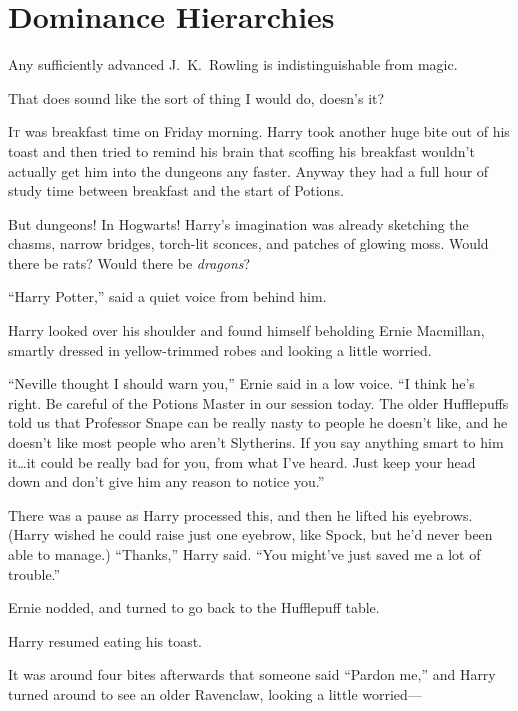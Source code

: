 \chapter{Dominance Hierarchies}

\begin{chapterOpeningAuthorNote}
Any sufficiently advanced J.~K.~Rowling is indistinguishable from magic.
\end{chapterOpeningAuthorNote}
\begin{chapterOpeningQuote}
That does sound like the sort of thing I would do, doesn’s it?
\end{chapterOpeningQuote}

\lettrine{I}{t} was breakfast time on Friday morning. Harry took another huge bite out of his toast and then tried to remind his brain that scoffing his breakfast wouldn’t actually get him into the dungeons any faster. Anyway they had a full hour of study time between breakfast and the start of Potions.

But dungeons! In Hogwarts! Harry’s imagination was already sketching the chasms, narrow bridges, torch-lit sconces, and patches of glowing moss. Would there be rats? Would there be \emph{dragons}?

“Harry Potter,” said a quiet voice from behind him.

Harry looked over his shoulder and found himself beholding Ernie Macmillan, smartly dressed in yellow-trimmed robes and looking a little worried.

“Neville thought I should warn you,” Ernie said in a low voice. “I think he’s right. Be careful of the Potions Master in our session today. The older Hufflepuffs told us that Professor Snape can be really nasty to people he doesn’t like, and he doesn’t like most people who aren’t Slytherins. If you say anything smart to him it…it could be really bad for you, from what I’ve heard. Just keep your head down and don’t give him any reason to notice you.”

There was a pause as Harry processed this, and then he lifted his eyebrows. (Harry wished he could raise just one eyebrow, like Spock, but he’d never been able to manage.) “Thanks,” Harry said. “You might’ve just saved me a lot of trouble.”

Ernie nodded, and turned to go back to the Hufflepuff table.

Harry resumed eating his toast.

It was around four bites afterwards that someone said “Pardon me,” and Harry turned around to see an older Ravenclaw, looking a little worried—

